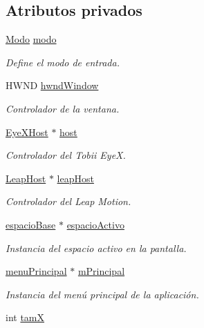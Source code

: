 \subsection*{Atributos privados}
\begin{DoxyCompactItemize}
\item 
\hyperlink{classof_app_aab1f96029bf7fd45f397fc24647f3494}{Modo} \hyperlink{classof_app_a8b4789de524f7b1376a44dc6caba6cb9}{modo}
\begin{DoxyCompactList}\small\item\em Define el modo de entrada. \end{DoxyCompactList}\item 
H\+W\+N\+D \hyperlink{classof_app_a764c01ed9a5c4bc9c3a4f6e6fed854c1}{hwnd\+Window}
\begin{DoxyCompactList}\small\item\em Controlador de la ventana. \end{DoxyCompactList}\item 
\hyperlink{class_eye_x_host}{Eye\+X\+Host} $\ast$ \hyperlink{classof_app_afcf3654e64e9c180a113194cdb8a8e23}{host}
\begin{DoxyCompactList}\small\item\em Controlador del Tobii Eye\+X. \end{DoxyCompactList}\item 
\hyperlink{class_leap_host}{Leap\+Host} $\ast$ \hyperlink{classof_app_aad56a9a303eb2d7becdba5ab7c117322}{leap\+Host}
\begin{DoxyCompactList}\small\item\em Controlador del Leap Motion. \end{DoxyCompactList}\item 
\hyperlink{classespacio_base}{espacio\+Base} $\ast$ \hyperlink{classof_app_a1e3e4e9da97b2a839dd1255c65f73453}{espacio\+Activo}
\begin{DoxyCompactList}\small\item\em Instancia del espacio activo en la pantalla. \end{DoxyCompactList}\item 
\hyperlink{classmenu_principal}{menu\+Principal} $\ast$ \hyperlink{classof_app_a9ba8bf05bd3a0932461179f47759b83d}{m\+Principal}
\begin{DoxyCompactList}\small\item\em Instancia del menú principal de la aplicación. \end{DoxyCompactList}\item 
int \hyperlink{classof_app_a07b648bd42ef7fda31bf208ccd18d5f8}{tam\+X}

\end{DoxyCompactItemize}
